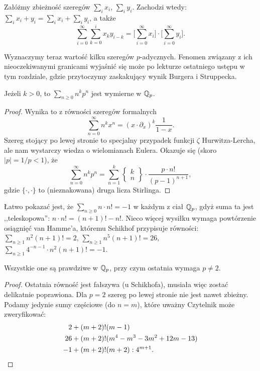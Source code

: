 \begin{fakt}
	Załóżmy zbieżność szeregów $\sum_i x_i$, $\sum_i y_i$.
	Zachodzi wtedy: $\sum_i x_i + y_i = \sum_i x_i + \sum_i y_i$, a także
	\[
		\sum_{i = 0}^\infty \sum_{k = 0}^i x_k y_{i-k} = \Bigr[\sum_{i = 0}^\infty x_i\Bigr] \cdot \Bigr[ \sum_{i = 0}^\infty y_i\Bigr].
	\]
\end{fakt}

Wyznaczymy teraz wartość kilku szeregów $p$-adycznych.
Fenomen związany z ich nieoczekiwanymi granicami wyjaśnić się może  po lekturze ostatniego ustępu w tym rozdziale, gdzie przytoczymy zaskakujący wynik Burgera i Struppecka.

\begin{fakt}
	Jeżeli $k > 0$, to $\sum_{n \ge 0} n^k p^n$ jest wymierne w $\mathbb Q_p$.
\end{fakt}

\begin{proof}
	Wynika to z równości szeregów formalnych
	\[
		\sum_{n = 0}^\infty n^k x^n = \left(x \cdot \partial_x\right)^k \frac{1}{1-x}.
	\]
	Szereg stojący po lewej stronie to specjalny przypadek funkcji $\zeta$ Hurwitza-Lercha, ale nam wystarczy wiedza o wielomianach Eulera. Okazuje się (skoro $|p| = 1 / p < 1$), że 
	\[
		\sum_{n = 0}^\infty n^k p^n = \sum_{n = 1}^k \left\{\begin{matrix} k \\ n \end{matrix}\right\} \cdot  \frac{p \cdot n!}{(p-1)^{n+1}},
	\]
	gdzie $\{\cdot, \cdot\}$ to (nieznakowana) druga licza Stirlinga.
\end{proof}

Łatwo pokazać jest, że $\sum_{n \ge 0} n \cdot n! = -1$ w każdym z ciał $\mathbb Q_p$, gdyż suma ta jest ,,teleskopowa'': $n \cdot n! = (n+1)! - n!$.
Nieco więcej wysiłku wymaga powtórzenie osiągnięć van Hamme'a, któremu Schikhof przypisuje równości:
$\sum_{n \ge 1} n^2 (n+1)! = 2$, 
$\sum_{n \ge 1} n^5 (n+1)! = 26$,
$\sum_{n \ge 1} 4^{-n-1} \cdot n^2(n+1)! = -1$.

\begin{fakt}
	Wszystkie one są prawdziwe w $\mathbb Q_p$, przy czym ostatnia wymaga $p \neq 2$.
\end{fakt}

\begin{proof}
	Ostatnia równość jest fałszywa (u Schikhofa), musiała więc zostać delikatnie poprawiona.
	Dla $p = 2$ szereg po lewej stronie nie jest nawet zbieżny.
	Podamy jedynie sumy częściowe (do $n = m$), które uważny Czytelnik może zweryfikować:
	\begin{align*}
	2 & + (m+2)! (m-1) \\
	26 & + (m+2)! (m^4 - m^3 - 3m^2 +12m-13) \\
	- 1 & + (m + 2)! (m + 2) : 4^{m+1}. \qedhere
	\end{align*}
\end{proof}

